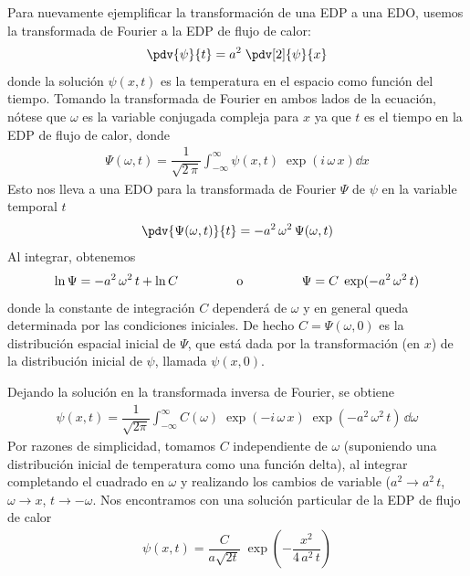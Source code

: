 Para nuevamente ejemplificar la transformación de una EDP a una EDO, usemos la transformada de Fourier a la EDP de flujo de calor:
\begin{align*}
\pdv{\psi}{t} = a^{2} \; \pdv[2]{\psi}{x}
\end{align*}
donde la solución $\psi(x,t)$ es la temperatura en el espacio como función del tiempo. Tomando la transformada de Fourier en ambos lados de la ecuación, nótese que $\omega$ es la variable conjugada compleja para $x$ ya que $t$ es el tiempo en la EDP de flujo de calor, donde
\begin{align*}
\Psi(\omega, t) = \dfrac{1}{\sqrt{2 \, \pi}} \int_{-\infty}^{\infty} \psi(x, t) \; \exp(i \, \omega \, x) \dd{x}
\end{align*}
Esto nos lleva a una EDO para la transformada de Fourier $\Psi$ de $\psi$ en la variable temporal $t$
\begin{align*}
\pdv{\Psi(\omega, t)}{t} = -a^{2} \, \omega^{2} \, \Psi(\omega, t)
\end{align*}
Al integrar, obtenemos
\begin{align*}
\ln \Psi = -a^{2} \, \omega^{2} \, t + \ln C \hspace{1.5cm} \text{ o } \hspace{1.5cm} \Psi = C \; \exp(-a^{2} \, \omega^{2} \, t)
\end{align*}
donde la constante de integración $C$ dependerá de $\omega$ y en general queda determinada por las condiciones iniciales. De hecho $C = \Psi(\omega, 0)$ es la distribución espacial inicial de $\Psi$, que está dada por la transformación (en $x$) de la distribución inicial de $\psi$, llamada $\psi(x,0)$.
\par
Dejando la solución en la transformada inversa de Fourier, se obtiene
\begin{align*}
\psi(x, t) = \dfrac{1}{\sqrt{2 \pi}} \int_{-\infty}^{\infty} C(\omega) \; \exp(-i \, \omega \, x) \; \exp(-a^{2} \, \omega^{2} \, t) \, \dd{\omega}
\end{align*}
Por razones de simplicidad, tomamos $C$ independiente de $\omega$ (suponiendo una distribución inicial de temperatura como una función delta), al integrar completando el cuadrado en $\omega$ y realizando los cambios de variable ($a^{2} \to a^{2} \, t$, $\omega \to x$, $t \to -\omega$. Nos encontramos con una solución particular de la EDP de flujo de calor
\begin{align*}
\psi(x,t) = \dfrac{C}{a \sqrt{2 t}} \; \exp \left( - \dfrac{x^{2}}{4 \, a^{2} \, t} \right)
\end{align*}

